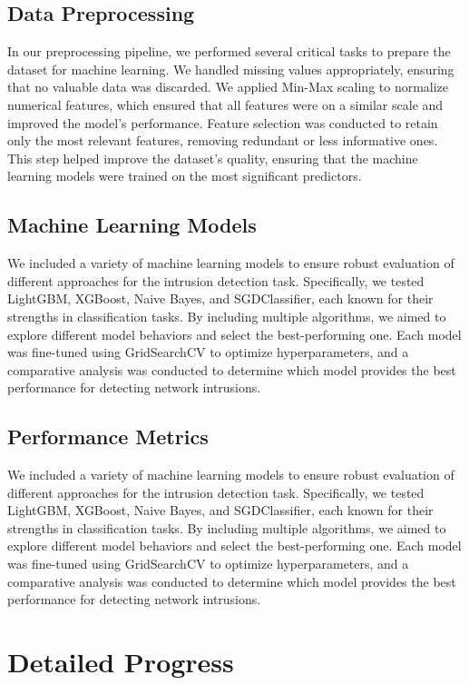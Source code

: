 \documentclass[conference]{IEEEtran}
\begin{document}
	\subsection{Data Preprocessing}
	In our preprocessing pipeline, we performed several critical tasks to prepare the dataset for machine learning. We handled missing values appropriately, ensuring that no valuable data was discarded. We applied Min-Max scaling to normalize numerical features, which ensured that all features were on a similar scale and improved the model's performance. Feature selection was conducted to retain only the most relevant features, removing redundant or less informative ones. This step helped improve the dataset’s quality, ensuring that the machine learning models were trained on the most significant predictors.
	
	\subsection{Machine Learning Models}
	We included a variety of machine learning models to ensure robust evaluation of different approaches for the intrusion detection task. Specifically, we tested LightGBM, XGBoost, Naive Bayes, and SGDClassifier, each known for their strengths in classification tasks. By including multiple algorithms, we aimed to explore different model behaviors and select the best-performing one. Each model was fine-tuned using GridSearchCV to optimize hyperparameters, and a comparative analysis was conducted to determine which model provides the best performance for detecting network intrusions.
	
	\subsection{Performance Metrics}\label{AA}
	We included a variety of machine learning models to ensure robust evaluation of different approaches for the intrusion detection task. Specifically, we tested LightGBM, XGBoost, Naive Bayes, and SGDClassifier, each known for their strengths in classification tasks. By including multiple algorithms, we aimed to explore different model behaviors and select the best-performing one. Each model was fine-tuned using GridSearchCV to optimize hyperparameters, and a comparative analysis was conducted to determine which model provides the best performance for detecting network intrusions.
	
	\section{Detailed Progress}
\end{document}
